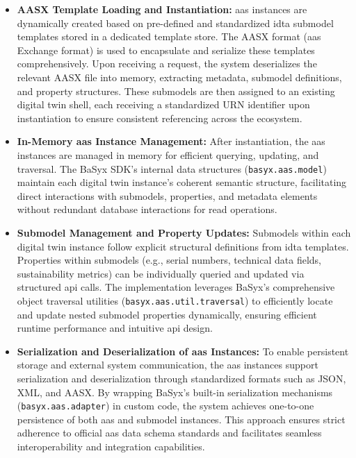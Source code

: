 \begin{itemize}[itemsep=0.5\baselineskip]
    \item \textbf{AASX Template Loading and Instantiation:} \ac{aas} instances are dynamically created based on pre-defined and standardized \ac{idta} submodel templates stored in a dedicated template store. The AASX format (\acrlong{aas} Exchange format) is used to encapsulate and serialize these templates comprehensively. Upon receiving a request, the system deserializes the relevant AASX file into memory, extracting metadata, submodel definitions, and property structures. These submodels are then assigned to an existing digital twin shell, each receiving a standardized URN identifier upon instantiation to ensure consistent referencing across the ecosystem.
    
    \item \textbf{In-Memory \ac{aas} Instance Management:} After instantiation, the \ac{aas} instances are managed in memory for efficient querying, updating, and traversal. The BaSyx SDK’s internal data structures (\verb|basyx.aas.model|) maintain each digital twin instance's coherent semantic structure, facilitating direct interactions with submodels, properties, and metadata elements without redundant database interactions for read operations.

    \item \textbf{Submodel Management and Property Updates:} Submodels within each digital twin instance follow explicit structural definitions from \ac{idta} templates. Properties within submodels (e.g., serial numbers, technical data fields, sustainability metrics) can be individually queried and updated via structured \ac{api} calls. The implementation leverages BaSyx's comprehensive object traversal utilities (\verb|basyx.aas.util.traversal|) to efficiently locate and update nested submodel properties dynamically, ensuring efficient runtime performance and intuitive \ac{api} design.

    \item \textbf{Serialization and Deserialization of \ac{aas} Instances:} To enable persistent storage and external system communication, the \ac{aas} instances support serialization and deserialization through standardized formats such as JSON, XML, and AASX. By wrapping BaSyx’s built-in serialization mechanisms (\verb|basyx.aas.adapter|) in custom code, the system achieves one-to-one persistence of both \ac{aas} and submodel instances. This approach ensures strict adherence to official \ac{aas} data schema standards and facilitates seamless interoperability and integration capabilities.


\end{itemize}
